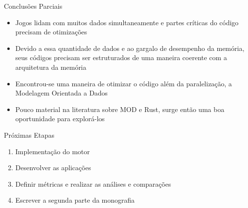\documentclass{beamer}
\begin{document}
\begin{frame}[t]{Conclusões Parciais}
    \begin{itemize}
        \item Jogos lidam com muitos dados simultaneamente e partes críticas do código 
            precisam de otimizações
        \item Devido a essa quantidade de dados e ao gargalo de desempenho da memória, 
            seus códigos precisam ser estruturados de uma maneira coerente com a 
            arquitetura da memória
        \item Encontrou-se uma maneira de otimizar o código além da paralelização, a 
            Modelagem Orientada a Dados
        \item Pouco material na literatura sobre MOD e Rust, surge então uma boa 
            oportunidade para explorá-los
    \end{itemize}
\end{frame}

\begin{frame}[t]{Próximas Etapas}
    \begin{enumerate}
        \item Implementação do motor
        \item Desenvolver as aplicações
        \item Definir métricas e realizar as análises e comparações
        \item Escrever a segunda parte da monografia
    \end{enumerate}
\end{frame}
\end{document}
